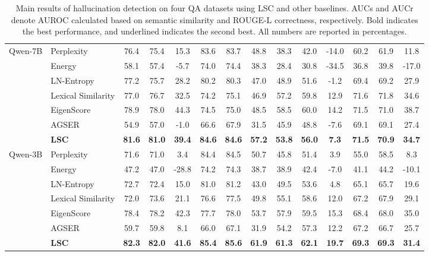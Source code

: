 \begin{table}[h]
{\begin{tabular}{ll|ccc|ccc|ccc|ccc}
\multirow{7}{*}{Qwen-7B}
& Perplexity & 76.4 & 75.4 & 15.3 & 83.6 & 83.7 & 48.8 & 38.3 & 42.0 & -14.0 & 60.2 & 61.9 & 11.8 \\
& Energy & 58.1 & 57.4 & -5.7 & 74.0 & 74.4 & 38.3 & 28.4 & 30.8 & -34.5 & 36.8 & 39.8 & -17.0 \\
& LN-Entropy & 77.2 & 75.7 & 28.2 & 80.2 & 80.3 & 47.0 & 48.9 & 51.6 & -1.2 & 69.4 & 69.2 & 27.9 \\
& Lexical Similarity & 77.0 & 76.7 & 32.5 & 74.2 & 75.1 & 46.9 & 57.2 & 59.8 & 12.9 & 71.6 & 71.8 & 34.6 \\
& EigenScore & 78.9 & 78.0 & 44.3 & 74.5 & 75.0 & 48.5 & 58.5 & 60.0 & 14.2 & 71.5 & 71.0 & 38.7 \\
& AGSER & 54.9 & 57.0 & -1.0 & 66.6 & 67.9 & 31.5 & 45.9 & 48.8 & -7.6 & 69.1 & 69.1 & 27.4 \\
& \textbf{LSC} & \textbf{81.6} & \textbf{81.0} & \textbf{39.4} & \textbf{84.6} & \textbf{84.6} & \textbf{57.2} & \textbf{53.8} & \textbf{56.0} & \textbf{7.3} & \textbf{71.5} & \textbf{70.9} & \textbf{34.7} \\
\midrule

\multirow{7}{*}{Qwen-3B}
& Perplexity & 71.6 & 71.0 & 3.4 & 84.4 & 84.5 & 50.7 & 45.8 & 51.4 & 3.9 & 55.0 & 58.5 & 8.3 \\
& Energy & 47.2 & 47.0 & -28.8 & 74.2 & 74.3 & 38.7 & 38.9 & 42.4 & -7.0 & 41.1 & 44.2 & -10.1 \\
& LN-Entropy & 72.7 & 72.4 & 15.0 & 81.0 & 81.2 & 43.0 & 49.5 & 53.6 & 4.8 & 65.1 & 65.7 & 19.6 \\
& Lexical Similarity & 72.0 & 73.6 & 21.1 & 76.6 & 77.5 & 49.8 & 55.1 & 58.6 & 12.0 & 67.2 & 67.9 & 29.1 \\
& EigenScore & 78.4 & 78.2 & 42.3 & 77.7 & 78.0 & 53.7 & 57.9 & 59.5 & 15.3 & 68.4 & 68.0 & 35.0 \\
& AGSER & 59.7 & 59.8 & 8.1 & 66.0 & 67.1 & 31.9 & 54.2 & 57.3 & 12.2 & 67.2 & 66.7 & 25.7 \\
& \textbf{LSC} & \textbf{82.3} & \textbf{82.0} & \textbf{41.6} & \textbf{85.4} & \textbf{85.6} & \textbf{61.9} & \textbf{61.3} & \textbf{62.1} & \textbf{19.7} & \textbf{69.3} & \textbf{69.3} & \textbf{31.4} \\
\bottomrule
\end{tabular}}
\caption{Main results of hallucination detection on four QA datasets using LSC and other baselines. AUCs and AUCr denote AUROC calculated based on semantic similarity and ROUGE-L correctness, respectively. Bold indicates the best performance, and underlined indicates the second best. All numbers are reported in percentages.}
\end{table}

